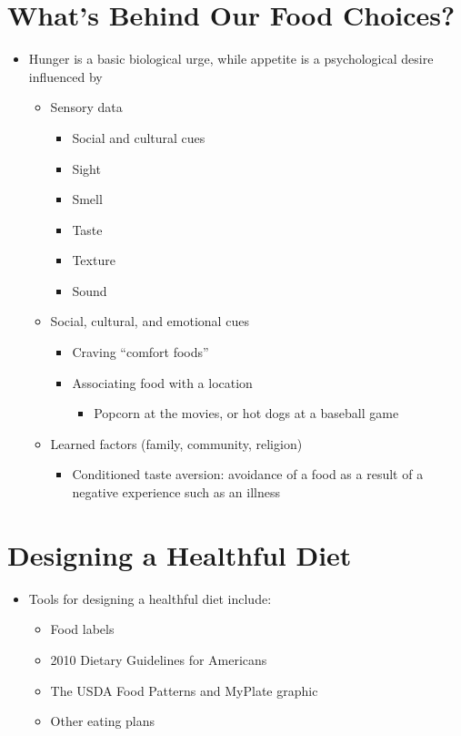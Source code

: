 \documentclass[title={Chapter 2}]{fdsn201notes}
\begin{document}
\section{What's Behind Our Food Choices?}\label{sec:what's-behind-our-food-choices?}
\begin{itemize}
	\item Hunger is a basic biological urge, while appetite is a psychological desire influenced by
	\begin{itemize}
		\item Sensory data
		\begin{itemize}
			\item Social and cultural cues
			\item Sight
			\item Smell
			\item Taste
			\item Texture
			\item Sound
		\end{itemize}
		\item Social, cultural, and emotional cues
		\begin{itemize}
			\item Craving ``comfort foods''
			\item Associating food with a location
			\begin{itemize}
				\item Popcorn at the movies, or hot dogs at a baseball game
			\end{itemize}
		\end{itemize}
		\item Learned factors (family, community, religion)
		\begin{itemize}
			\item Conditioned taste aversion: avoidance of a food as a result of a negative experience such as an illness
		\end{itemize}
	\end{itemize}
\end{itemize}

\section{Designing a Healthful Diet}\label{sec:designing-a-healthful-diet}
\begin{itemize}
	\item Tools for designing a healthful diet include:
	\begin{itemize}
		\item Food labels
		\item 2010 Dietary Guidelines for Americans
		\item The USDA Food Patterns and MyPlate graphic
		\item Other eating plans
	\end{itemize}
\end{itemize}
\end{document}
